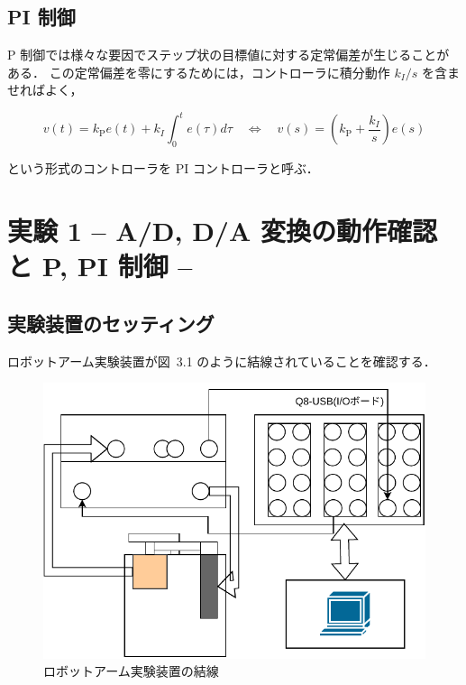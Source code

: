 \subsection{PI 制御}
P 制御では様々な要因でステップ状の目標値に対する定常偏差が生じることがある．
この定常偏差を零にするためには，コントローラに積分動作 \( k_I /s \) を含ませればよく，

\begin{equation}
  v(t) = k_{\mathrm{P}} e(t) + k_I \int_{0}^{t} e(\tau) d\tau \quad \Longleftrightarrow \quad v(s) = \left( k_{\mathrm{P}} + \frac{k_I}{s} \right)e(s)
\end{equation}

という形式のコントローラを PI コントローラと呼ぶ．


\section{実験 1 -- A/D, D/A 変換の動作確認と P, PI 制御 --}

\subsection{実験装置のセッティング}
ロボットアーム実験装置が図~3.1 のように結線されていることを確認する．


\begin{figure}[h]
  \centering
  \includegraphics[scale=0.8]{sozai/4.pdf}
  \caption{ロボットアーム実験装置の結線}
\end{figure}

